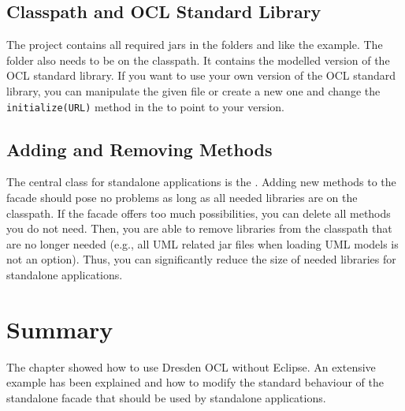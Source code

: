 \subsection{Classpath and OCL Standard Library}
The project contains all required jars in the folders  and 
 like the example. The  folder also 
needs to be on the classpath. It contains the modelled version of the OCL 
standard library. If you want to use your own version of the OCL standard 
library, you can manipulate the given file or create a new one and change the
\lstinline[breaklines=true]{initialize(URL)} method in the 
 to point to your version.


\subsection{Adding and Removing Methods}
The central class for standalone applications is the . 
Adding new methods to the facade should pose no problems as long as all needed
libraries are on the classpath. If the facade offers too much possibilities, 
you can delete all methods you do not need. Then, you are able to remove 
libraries from the classpath that are no longer needed (e.g., all UML related 
jar files when loading UML models is not an option). Thus, you can significantly
reduce the size of needed libraries for standalone applications.


\section{Summary}

The chapter showed how to use Dresden OCL without Eclipse. An extensive example
has been explained and how to modify the standard behaviour of the standalone 
facade that should be used by standalone applications.

